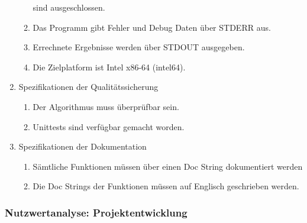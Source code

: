 \begin{enumerate}
\begin{enumerate}
            sind ausgeschlossen.
            \item Das Programm gibt Fehler und Debug Daten über STDERR aus.
            \item Errechnete Ergebnisse werden über STDOUT ausgegeben.
            \item Die Zielplatform ist Intel x86-64 (intel64).
        \end{enumerate}
    \item Spezifikationen der Qualitätssicherung
        \begin{enumerate}
            \item Der Algorithmus muss überprüfbar sein.
            \item Unittests sind verfügbar gemacht worden.
        \end{enumerate}
    \item Spezifikationen der Dokumentation
        \begin{enumerate}
            \item Sämtliche Funktionen müssen über einen Doc String dokumentiert werden
            \item Die Doc Strings der Funktionen müssen auf Englisch geschrieben werden.
        \end{enumerate}
\end{enumerate}

\subsubsection{Nutzwertanalyse: Projektentwicklung}

